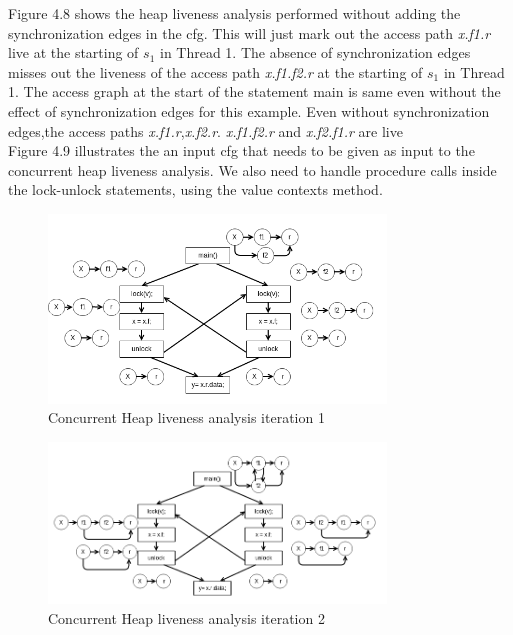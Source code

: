 Figure 4.8 shows the heap liveness analysis performed without adding the synchronization edges in the cfg. This will just mark out the access path \emph{x.f1.r} live at the starting of $s_1$ in Thread 1. The absence of synchronization edges misses out the liveness of the access path \emph{x.f1.f2.r} at the starting of $s_1$ in Thread 1. The access graph at the start of the statement main is same even without the effect of synchronization edges for this example. Even without synchronization edges,the access paths \emph{x.f1.r},\emph{x.f2.r}. \emph{x.f1.f2.r} and \emph{x.f2.f1.r} are live  \\

Figure 4.9 illustrates the an input cfg that needs to be given as input to the concurrent heap liveness analysis. We also  need to handle procedure calls inside the lock-unlock statements, using the value contexts method. 

\begin{figure}
	\centering
	\includegraphics[width=0.8\textwidth]{Figures/conc_analysis_itr1.png}
	\caption{Concurrent Heap liveness analysis iteration 1}
	\label{fig:nullpointeranalysis}
\end{figure}

\begin{figure}
	\centering
	\includegraphics[width=0.8\textwidth]{Figures/conc_analysis_itr2.png}
	\caption{Concurrent Heap liveness analysis iteration 2}
	\label{fig:nullpointeranalysis}
\end{figure}

